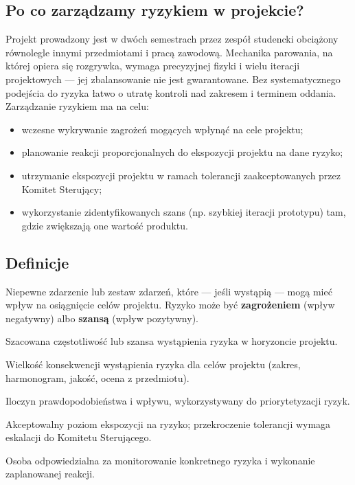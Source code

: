 \documentclass[11pt,a4paper]{article}
\begin{document}
	\subsection{Po co zarządzamy ryzykiem w projekcie?}
	Projekt prowadzony jest w dwóch semestrach przez zespół studencki obciążony równolegle
	innymi przedmiotami i pracą zawodową. Mechanika parowania, na której opiera się rozgrywka,
	wymaga precyzyjnej fizyki i wielu iteracji projektowych --- jej zbalansowanie nie jest
	gwarantowane. Bez systematycznego podejścia do ryzyka łatwo o utratę kontroli nad zakresem
	i terminem oddania. Zarządzanie ryzykiem ma na celu:
	\begin{itemize}[noitemsep]
		\item wczesne wykrywanie zagrożeń mogących wpłynąć na cele projektu;
		\item planowanie reakcji proporcjonalnych do ekspozycji projektu na dane ryzyko;
		\item utrzymanie ekspozycji projektu w ramach tolerancji zaakceptowanych przez Komitet Sterujący;
		\item wykorzystanie zidentyfikowanych szans (np. szybkiej iteracji prototypu) tam, gdzie zwiększają one wartość produktu.
	\end{itemize}
	
	\subsection{Definicje}
	\begin{description}[style=nextline, leftmargin=0pt]
		\item[Ryzyko] Niepewne zdarzenie lub zestaw zdarzeń, które --- jeśli wystąpią --- mogą mieć wpływ na osiągnięcie celów projektu. Ryzyko może być \textbf{zagrożeniem} (wpływ negatywny) albo \textbf{szansą} (wpływ pozytywny).
		\item[Prawdopodobieństwo] Szacowana częstotliwość lub szansa wystąpienia ryzyka w horyzoncie projektu.
		\item[Wpływ] Wielkość konsekwencji wystąpienia ryzyka dla celów projektu (zakres, harmonogram, jakość, ocena z przedmiotu).
		\item[Ekspozycja na ryzyko] Iloczyn prawdopodobieństwa i wpływu, wykorzystywany do priorytetyzacji ryzyk.
		\item[Tolerancja ryzyka] Akceptowalny poziom ekspozycji na ryzyko; przekroczenie tolerancji wymaga eskalacji do Komitetu Sterującego.
		\item[Właściciel ryzyka] Osoba odpowiedzialna za monitorowanie konkretnego ryzyka i wykonanie zaplanowanej reakcji.
	\end{description}
	
\end{document}
